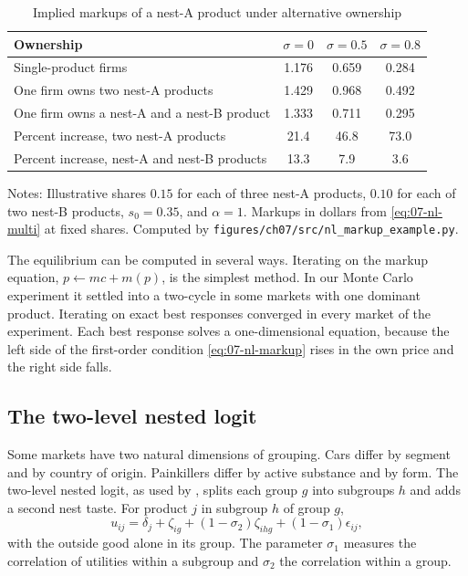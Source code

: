 \begin{table}[htbp]
\centering
\caption{Implied markups of a nest-A product under alternative ownership}\label{tab:07-nl-markup-example}
\small
\begin{tabular}{@{}lccc@{}}
\toprule
Ownership & $\sigma = 0$ & $\sigma = 0.5$ & $\sigma = 0.8$ \\
\midrule
Single-product firms & 1.176 & 0.659 & 0.284 \\
One firm owns two nest-A products & 1.429 & 0.968 & 0.492 \\
One firm owns a nest-A and a nest-B product & 1.333 & 0.711 & 0.295 \\
\addlinespace
Percent increase, two nest-A products & 21.4 & 46.8 & 73.0 \\
Percent increase, nest-A and nest-B products & 13.3 & 7.9 & 3.6 \\
\bottomrule
\end{tabular}
\par\smallskip
\begin{minipage}{0.8\textwidth}
\footnotesize Notes: Illustrative shares $0.15$ for each of three nest-A products, $0.10$ for each of two nest-B
products, $s_0 = 0.35$, and $\alpha = 1$. Markups in dollars from \eqref{eq:07-nl-multi} at fixed shares. Computed by
\texttt{figures/ch07/src/nl\_markup\_example.py}.
\end{minipage}
\end{table}

The equilibrium can be computed in several ways. Iterating on the markup equation,
$p \leftarrow mc + m(p)$, is the simplest method. In our Monte Carlo experiment it settled into a two-cycle in some
markets with one dominant product. Iterating on exact best responses converged in every market of the experiment.
Each best response solves a one-dimensional equation, because the left side of the first-order condition
\eqref{eq:07-nl-markup} rises in the own price and the right side falls.

\subsection{The two-level nested logit}\label{sec:07-nl-twolevel}

Some markets have two natural dimensions of grouping. Cars differ by segment and by country of origin. Painkillers
differ by active substance and by form. The two-level nested logit, as used by \citet{Verboven1996}, splits each group $g$
into subgroups $h$ and adds a second nest taste. For product $j$ in subgroup $h$ of group $g$,
\begin{equation}\label{eq:07-nl2-utility}
u_{ij} = \delta_j + \zeta_{ig} + (1 - \sigma_2)\zeta_{ihg} + (1 - \sigma_1)\epsilon_{ij} ,
\end{equation}
with the outside good alone in its group. The parameter $\sigma_1$ measures the correlation of utilities within a
subgroup and $\sigma_2$ the correlation within a group.

